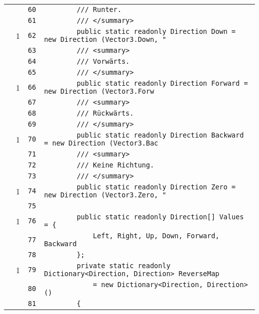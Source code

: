 \documentclass[a4paper,10pt]{article}
\begin{document}
\begin{longtable}[l]{lrrl}
\cellcolor{gray} &  & \verb~60~ & \verb~        /// Runter.~\\
\cellcolor{gray} &  & \verb~61~ & \verb~        /// </summary>~\\
\cellcolor{green} & 1 & \verb~62~ & \verb~        public static readonly Direction Down = new Direction (Vector3.Down, "~\\
\cellcolor{gray} &  & \verb~63~ & \verb~        /// <summary>~\\
\cellcolor{gray} &  & \verb~64~ & \verb~        /// Vorwärts.~\\
\cellcolor{gray} &  & \verb~65~ & \verb~        /// </summary>~\\
\cellcolor{green} & 1 & \verb~66~ & \verb~        public static readonly Direction Forward = new Direction (Vector3.Forw~\\
\cellcolor{gray} &  & \verb~67~ & \verb~        /// <summary>~\\
\cellcolor{gray} &  & \verb~68~ & \verb~        /// Rückwärts.~\\
\cellcolor{gray} &  & \verb~69~ & \verb~        /// </summary>~\\
\cellcolor{green} & 1 & \verb~70~ & \verb~        public static readonly Direction Backward = new Direction (Vector3.Bac~\\
\cellcolor{gray} &  & \verb~71~ & \verb~        /// <summary>~\\
\cellcolor{gray} &  & \verb~72~ & \verb~        /// Keine Richtung.~\\
\cellcolor{gray} &  & \verb~73~ & \verb~        /// </summary>~\\
\cellcolor{green} & 1 & \verb~74~ & \verb~        public static readonly Direction Zero = new Direction (Vector3.Zero, "~\\
\cellcolor{gray} &  & \verb~75~ & \verb~~\\
\cellcolor{green} & 1 & \verb~76~ & \verb~        public static readonly Direction[] Values = {~\\
\cellcolor{gray} &  & \verb~77~ & \verb~            Left, Right, Up, Down, Forward,  Backward~\\
\cellcolor{gray} &  & \verb~78~ & \verb~        };~\\
\cellcolor{green} & 1 & \verb~79~ & \verb~        private static readonly Dictionary<Direction, Direction> ReverseMap~\\
\cellcolor{gray} &  & \verb~80~ & \verb~            = new Dictionary<Direction, Direction> ()~\\
\cellcolor{gray} &  & \verb~81~ & \verb~        {~\\

\end{longtable}
\end{document}
